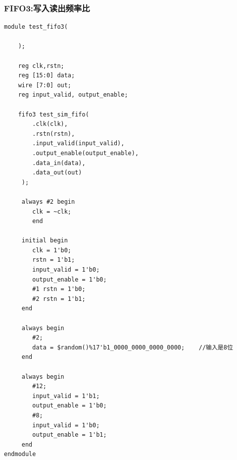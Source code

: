 \documentclass[fontset=windows,12pt]{article}
\begin{document}
\subsubsection{FIFO3:写入读出频率比}
{\setmainfont{Courier New Bold}                               
\begin{lstlisting}
module test_fifo3(

    );
    
    reg clk,rstn;
    reg [15:0] data;
    wire [7:0] out;
    reg input_valid, output_enable;
    
    fifo3 test_sim_fifo(
        .clk(clk),
        .rstn(rstn),
        .input_valid(input_valid),
        .output_enable(output_enable),
        .data_in(data),
        .data_out(out)
     );
     
     always #2 begin
        clk = ~clk;
        end
    
     initial begin
        clk = 1'b0;
        rstn = 1'b1;
        input_valid = 1'b0;
        output_enable = 1'b0;
        #1 rstn = 1'b0;
        #2 rstn = 1'b1;
     end
     
     always begin
        #2;
        data = $random()%17'b1_0000_0000_0000_0000;    //输入是8位
     end
     
     always begin
        #12;
        input_valid = 1'b1;
        output_enable = 1'b0;
        #8;
        input_valid = 1'b0;
        output_enable = 1'b1;
     end
endmodule
\end{lstlisting}}
\end{document}
